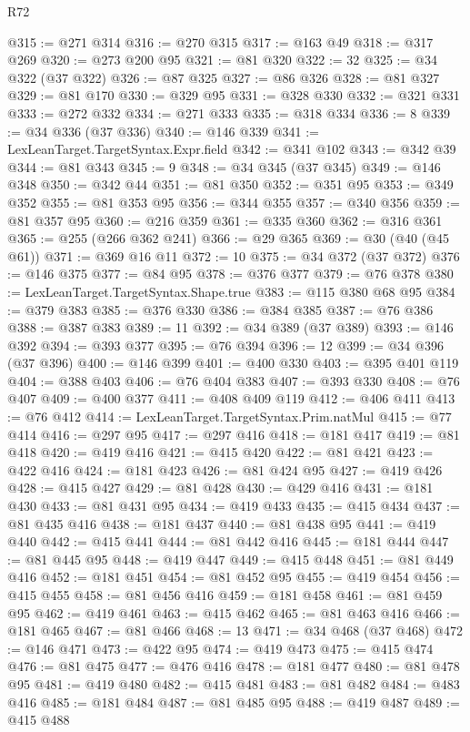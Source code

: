 \begin{lexlean}{R72}
\begin{coremodule}
@315 := @271 @314
@316 := @270 @315
@317 := @163 @49
@318 := @317 @269
@320 := @273 @200 @95
@321 := @81 @320
@322 := 32
@325 := @34 @322 (@37 @322)
@326 := @87 @325
@327 := @86 @326
@328 := @81 @327
@329 := @81 @170
@330 := @329 @95
@331 := @328 @330
@332 := @321 @331
@333 := @272 @332
@334 := @271 @333
@335 := @318 @334
@336 := 8
@339 := @34 @336 (@37 @336)
@340 := @146 @339
@341 := LexLeanTarget.TargetSyntax.Expr.field
@342 := @341 @102
@343 := @342 @39
@344 := @81 @343
@345 := 9
@348 := @34 @345 (@37 @345)
@349 := @146 @348
@350 := @342 @44
@351 := @81 @350
@352 := @351 @95
@353 := @349 @352
@355 := @81 @353 @95
@356 := @344 @355
@357 := @340 @356
@359 := @81 @357 @95
@360 := @216 @359
@361 := @335 @360
@362 := @316 @361
@365 := @255 (@266 @362 @241)
@366 := @29 @365
@369 := @30 (@40 (@45 @61))
@371 := @369 @16 @11
@372 := 10
@375 := @34 @372 (@37 @372)
@376 := @146 @375
@377 := @84 @95
@378 := @376 @377
@379 := @76 @378
@380 := LexLeanTarget.TargetSyntax.Shape.true
@383 := @115 @380 @68 @95
@384 := @379 @383
@385 := @376 @330
@386 := @384 @385
@387 := @76 @386
@388 := @387 @383
@389 := 11
@392 := @34 @389 (@37 @389)
@393 := @146 @392
@394 := @393 @377
@395 := @76 @394
@396 := 12
@399 := @34 @396 (@37 @396)
@400 := @146 @399
@401 := @400 @330
@403 := @395 @401 @119
@404 := @388 @403
@406 := @76 @404 @383
@407 := @393 @330
@408 := @76 @407
@409 := @400 @377
@411 := @408 @409 @119
@412 := @406 @411
@413 := @76 @412
@414 := LexLeanTarget.TargetSyntax.Prim.natMul
@415 := @77 @414
@416 := @297 @95
@417 := @297 @416
@418 := @181 @417
@419 := @81 @418
@420 := @419 @416
@421 := @415 @420
@422 := @81 @421
@423 := @422 @416
@424 := @181 @423
@426 := @81 @424 @95
@427 := @419 @426
@428 := @415 @427
@429 := @81 @428
@430 := @429 @416
@431 := @181 @430
@433 := @81 @431 @95
@434 := @419 @433
@435 := @415 @434
@437 := @81 @435 @416
@438 := @181 @437
@440 := @81 @438 @95
@441 := @419 @440
@442 := @415 @441
@444 := @81 @442 @416
@445 := @181 @444
@447 := @81 @445 @95
@448 := @419 @447
@449 := @415 @448
@451 := @81 @449 @416
@452 := @181 @451
@454 := @81 @452 @95
@455 := @419 @454
@456 := @415 @455
@458 := @81 @456 @416
@459 := @181 @458
@461 := @81 @459 @95
@462 := @419 @461
@463 := @415 @462
@465 := @81 @463 @416
@466 := @181 @465
@467 := @81 @466
@468 := 13
@471 := @34 @468 (@37 @468)
@472 := @146 @471
@473 := @422 @95
@474 := @419 @473
@475 := @415 @474
@476 := @81 @475
@477 := @476 @416
@478 := @181 @477
@480 := @81 @478 @95
@481 := @419 @480
@482 := @415 @481
@483 := @81 @482
@484 := @483 @416
@485 := @181 @484
@487 := @81 @485 @95
@488 := @419 @487
@489 := @415 @488

\end{coremodule}
\end{lexlean}
